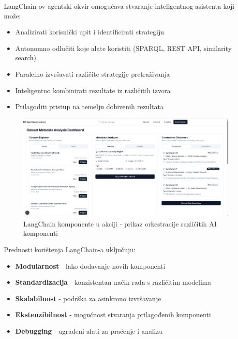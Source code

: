 LangChain-ov agentski okvir omogućava stvaranje inteligentnog asistenta koji može:

\begin{itemize}
    \item Analizirati korisnički upit i identificirati strategiju
    \item Autonomno odlučiti koje alate koristiti (SPARQL, REST API, similarity search)
    \item Paralelno izvršavati različite strategije pretraživanja
    \item Inteligentno kombinirati rezultate iz različitih izvora
    \item Prilagoditi pristup na temelju dobivenih rezultata
\end{itemize}

\begin{figure}[htbp]
    \centering
    \includegraphics[width=1\textwidth]{figures/izvjestaj_image_4.png}
    \caption{LangChain komponente u akciji - prikaz orkestracije različitih AI komponenti}
    \label{fig:langchain_orchestration}
\end{figure}

Prednosti korištenja LangChain-a uključuju:

\begin{itemize}
    \item \textbf{Modularnost} - lako dodavanje novih komponenti
    \item \textbf{Standardizacija} - konzistentan način rada s različitim modelima
    \item \textbf{Skalabilnost} - podrška za asinkrono izvršavanje
    \item \textbf{Ekstenzibilnost} - mogućnost stvaranja prilagođenih komponenti
    \item \textbf{Debugging} - ugrađeni alati za praćenje i analizu
\end{itemize}

